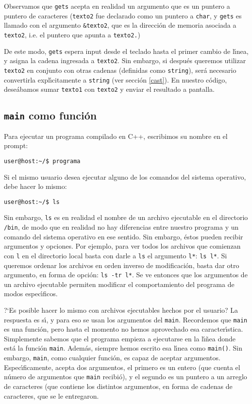 Observamos que \verb+gets+ acepta en realidad un argumento que es un
puntero a puntero de caracteres (\verb+texto2+ fue declarado como un
puntero a \verb+char+, y \verb+gets+ es llamado con el argumento
\verb+&texto2+, que es la direcci\'on de memoria asociada a
\verb+texto2+, i.e. el puntero que apunta a \verb+texto2.+) 

De este modo, \verb+gets+ espera input desde el teclado hasta el
primer cambio de l\'{\i}nea, y asigna la cadena ingresada a
\verb+texto2+. Sin embargo, si despu\'es queremos utilizar
\verb+texto2+ en conjunto con otras cadenas (definidas como
\verb+string+), ser\'a necesario convertirla expl\'{\i}citamente a
\verb+string+ (ver secci\'on \ref{cast}). En nuestro c\'odigo,
dese\'abamos sumar \verb+texto1+ con \verb+texto2+ y enviar el
resultado a pantalla.


\subsection{{\tt main} como funci\'on}


Para ejecutar un programa compilado en C++, escribimos su nombre en el
prompt:
\begin{verbatim}
user@host:~/$ programa
\end{verbatim}
Si el mismo usuario desea ejecutar alguno de los comandos del sistema
operativo, debe hacer lo mismo:
\begin{verbatim}
user@host:~/$ ls
\end{verbatim}

Sin embargo, \verb+ls+ es en realidad el nombre de un archivo
ejecutable en el directorio \verb+/bin+, de modo que en realidad no
hay diferencias entre nuestro programa y un comando del sistema
operativo en ese sentido. Sin embargo, \'estos pueden recibir
argumentos y opciones. Por ejemplo, para ver todos los archivos que
comienzan con \verb+l+ en el directorio local basta con darle a
\verb+ls+ el argumento \verb+l*+: \verb+ls l*+. Si queremos ordenar
los archivos en orden inverso de modificaci\'on, basta dar otro
argumento, en forma de opci\'on: \verb+ls -tr l*+. Se ve entonces que
los argumentos de un archivo ejecutable permiten modificar el
comportamiento del programa de modos espec\'{\i}ficos. 

?`Es posible hacer lo mismo con archivos ejecutables hechos por el
usuario? La respuesta es s\'{\i}, y para eso se usan los argumentos
del \verb+main+. Recordemos que \verb+main+ es una funci\'on, pero
hasta el momento no hemos aprovechado esa
caracter\'{\i}stica. Simplemente sabemos que el programa empieza a
ejecutarse en la  l\'{\i}\~nea donde est\'a la 
funci\'on \verb+main+. Adem\'as, siempre hemos
escrito esa l\'{\i}nea como \verb+main()+. Sin embargo, \verb+main+, como
cualquier funci\'on, es capaz de aceptar
argumentos. 
Espec\'{\i}ficamente, acepta dos argumentos, el primero es
un entero (que cuenta el n\'umero de argumentos que \verb+main+
recibi\'o), y  el segundo es un puntero a un arreglo de caracteres
(que contiene los distintos argumentos, en forma de cadenas de
caracteres, que se le entregaron.

